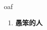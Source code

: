 
\begin{frame}
{\huge oaf}
\begin{center}
\begin{enumerate}\Large
  \item \textbf{愚笨的人}
\end{enumerate}
\end{center}
\end{frame}
